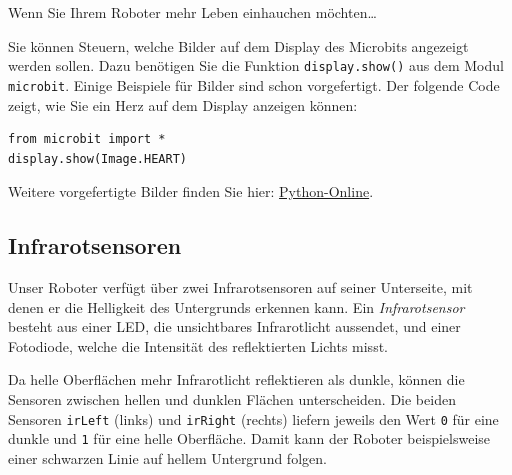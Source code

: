 \begin{myremark}
    Wenn Sie Ihrem Roboter mehr Leben einhauchen möchten\dots

    Sie können Steuern, welche Bilder auf dem Display des Microbits angezeigt werden sollen. Dazu benötigen Sie die Funktion \texttt{display.show()} aus dem Modul \texttt{microbit}. Einige Beispiele für Bilder sind schon vorgefertigt. Der folgende Code zeigt, wie Sie ein Herz auf dem Display anzeigen können:
    \begin{lstlisting}
from microbit import *
display.show(Image.HEART)
    \end{lstlisting}
    Weitere vorgefertigte Bilder finden Sie hier: \href{https://www.python-online.ch/en/robotik/mr/mbrobotdoc/}{Python-Online}.
\end{myremark}








\subsection*{Infrarotsensoren}

Unser Roboter verfügt über zwei Infrarotsensoren auf seiner
Unterseite, mit denen er die Helligkeit des Untergrunds
erkennen kann. Ein \emph{Infrarotsensor} besteht aus einer
LED, die unsichtbares Infrarotlicht aussendet, und einer
Fotodiode, welche die Intensität des reflektierten Lichts misst.

Da helle Oberflächen mehr Infrarotlicht reflektieren als
dunkle, können die Sensoren zwischen hellen und dunklen
Flächen unterscheiden. Die beiden Sensoren
\texttt{irLeft} (links) und \texttt{irRight} (rechts)
liefern jeweils den Wert \texttt{0} für eine dunkle
und \texttt{1} für eine helle Oberfläche.
Damit kann der Roboter beispielsweise einer schwarzen
Linie auf hellem Untergrund folgen.


